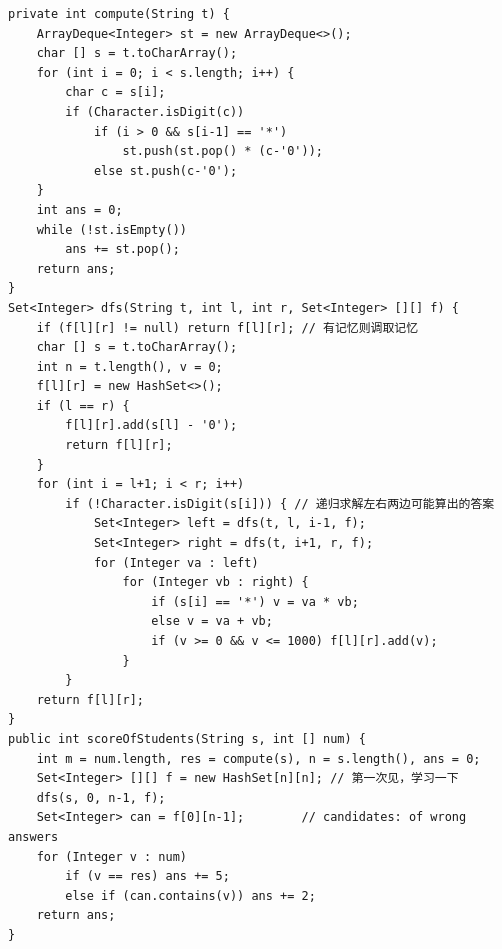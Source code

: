 \documentclass[9pt, b5paaper]{book}
\begin{document}
\begin{enumerate}
\begin{verbatim}
private int compute(String t) {
    ArrayDeque<Integer> st = new ArrayDeque<>();
    char [] s = t.toCharArray();
    for (int i = 0; i < s.length; i++) {
        char c = s[i];
        if (Character.isDigit(c)) 
            if (i > 0 && s[i-1] == '*') 
                st.push(st.pop() * (c-'0'));
            else st.push(c-'0');
    }
    int ans = 0;
    while (!st.isEmpty()) 
        ans += st.pop();
    return ans;
}
Set<Integer> dfs(String t, int l, int r, Set<Integer> [][] f) {
    if (f[l][r] != null) return f[l][r]; // 有记忆则调取记忆
    char [] s = t.toCharArray();
    int n = t.length(), v = 0;
    f[l][r] = new HashSet<>();
    if (l == r) {
        f[l][r].add(s[l] - '0');
        return f[l][r];
    }
    for (int i = l+1; i < r; i++) 
        if (!Character.isDigit(s[i])) { // 递归求解左右两边可能算出的答案
            Set<Integer> left = dfs(t, l, i-1, f);
            Set<Integer> right = dfs(t, i+1, r, f);
            for (Integer va : left) 
                for (Integer vb : right) {
                    if (s[i] == '*') v = va * vb;
                    else v = va + vb;
                    if (v >= 0 && v <= 1000) f[l][r].add(v);
                }
        }
    return f[l][r];
}
public int scoreOfStudents(String s, int [] num) { 
    int m = num.length, res = compute(s), n = s.length(), ans = 0;
    Set<Integer> [][] f = new HashSet[n][n]; // 第一次见，学习一下
    dfs(s, 0, n-1, f);
    Set<Integer> can = f[0][n-1];        // candidates: of wrong answers
    for (Integer v : num) 
        if (v == res) ans += 5;
        else if (can.contains(v)) ans += 2;
    return ans;
}
\end{verbatim}
\end{enumerate}
\end{document}
